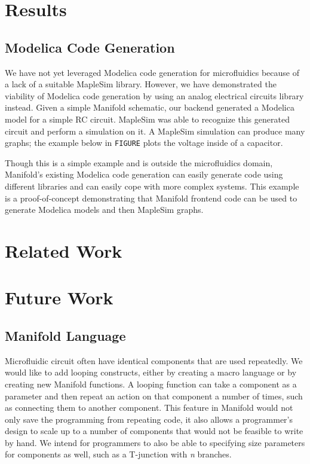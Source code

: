 \section{Results}

\subsection{Modelica Code Generation}

We have not yet leveraged Modelica code generation for microfluidics because of a lack of a suitable MapleSim library.
However, we have demonstrated the viability of Modelica code generation by using an analog electrical circuits library instead.
Given a simple Manifold schematic, our backend generated a Modelica model for a simple RC circuit.
MapleSim was able to recognize this generated circuit and perform a simulation on it.
A MapleSim simulation can produce many graphs; the example below in {\tt FIGURE} plots the voltage inside of a capacitor.


Though this is a simple example and is outside the microfluidics domain, Manifold's existing Modelica code generation can easily generate code using different libraries and can easily cope with more complex systems.
This example is a proof-of-concept demonstrating that Manifold frontend code can be used to generate Modelica models and then MapleSim graphs.

\section{Related Work}



\section{Future Work}

\subsection{Manifold Language}

Microfluidic circuit often have identical components that are used repeatedly. We would like to add
looping constructs, either by creating a macro language or by creating new Manifold functions. A
looping function can take a component as a parameter and then repeat an action on that component a
number of times, such as connecting them to another component. This feature in Manifold would not
only save the programming from repeating code, it also allows a programmer's design to scale up to
a number of components that would not be feasible to write by hand. We intend for programmers to
also be able to specifying size parameters for components as well, such as a T-junction with
\emph{n} branches.

